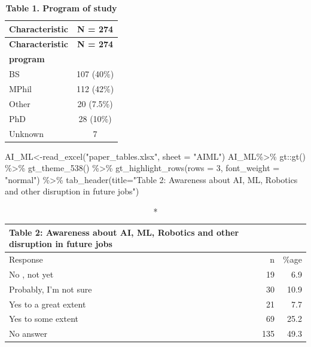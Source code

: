 \documentclass[
]{aft}
\newenvironment{Shaded}{\begin{snugshade}}{\end{snugshade}}
\newcommand{\AttributeTok}[1]{\textcolor[rgb]{0.40,0.45,0.13}{#1}}
\newcommand{\DecValTok}[1]{\textcolor[rgb]{0.68,0.00,0.00}{#1}}
\newcommand{\FunctionTok}[1]{\textcolor[rgb]{0.28,0.35,0.67}{#1}}
\newcommand{\NormalTok}[1]{\textcolor[rgb]{0.00,0.23,0.31}{#1}}
\newcommand{\OtherTok}[1]{\textcolor[rgb]{0.00,0.23,0.31}{#1}}
\newcommand{\SpecialCharTok}[1]{\textcolor[rgb]{0.37,0.37,0.37}{#1}}
\newcommand{\StringTok}[1]{\textcolor[rgb]{0.13,0.47,0.30}{#1}}
\begin{document}
\begin{longtable}[]{@{}lc@{}}
\caption{\textbf{Table 1. Program of study}}\tabularnewline
\toprule()
\textbf{Characteristic} & \textbf{N = 274} \\
\midrule()
\endfirsthead
\toprule()
\textbf{Characteristic} & \textbf{N = 274} \\
\midrule()
\endhead
\textbf{program} & \\
BS & 107 (40\%) \\
MPhil & 112 (42\%) \\
Other & 20 (7.5\%) \\
PhD & 28 (10\%) \\
Unknown & 7 \\
\bottomrule()
\end{longtable}

\begin{Shaded}
\begin{Highlighting}[]
\NormalTok{AI\_ML}\OtherTok{\textless{}{-}}\FunctionTok{read\_excel}\NormalTok{(}\StringTok{"paper\_tables.xlsx"}\NormalTok{,   }\AttributeTok{sheet =} \StringTok{"AIML"}\NormalTok{)}
\NormalTok{AI\_ML}\SpecialCharTok{\%\textgreater{}\%}\NormalTok{ gt}\SpecialCharTok{::}\FunctionTok{gt}\NormalTok{() }\SpecialCharTok{\%\textgreater{}\%} 
  \FunctionTok{gt\_theme\_538}\NormalTok{() }\SpecialCharTok{\%\textgreater{}\%}
  \FunctionTok{gt\_highlight\_rows}\NormalTok{(}\AttributeTok{rows =} \DecValTok{3}\NormalTok{, }\AttributeTok{font\_weight =} \StringTok{"normal"}\NormalTok{) }\SpecialCharTok{\%\textgreater{}\%} 
  \FunctionTok{tab\_header}\NormalTok{(}\AttributeTok{title=}\StringTok{"Table 2: Awareness about AI, ML, Robotics and other disruption in future jobs"}\NormalTok{)}
\end{Highlighting}
\end{Shaded}

\captionsetup[table]{labelformat=empty,skip=1pt}
\begin{longtable}{lrr}
\caption*{
{\large Table 2: Awareness about AI, ML, Robotics and other disruption in future jobs}
} \\ 
\toprule
Response & n & \%age \\ 
\midrule
No , not yet & 19 & 6.9 \\ 
Probably, I'm not sure & 30 & 10.9 \\ 
Yes to a great extent & 21 & 7.7 \\ 
Yes to some extent & 69 & 25.2 \\ 
No answer & 135 & 49.3 \\ 
\bottomrule
\end{longtable}
\end{document}

